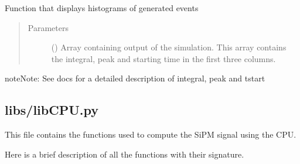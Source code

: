 \documentclass[letterpaper,10pt,english]{sphinxmanual}
\begin{document}

\begin{fulllineitems}
\label{\detokenize{structure:libs.lib.somestats}}
Function that displays histograms of generated events
\begin{quote}\begin{description}
\item[{Parameters}] \leavevmode
{} () \textendash{} Array containing output of the simulation. This array contains the integral, peak and starting time in the first three columns.

\end{description}\end{quote}

\begin{sphinxadmonition}{note}{Note:}
See docs for a detailed description of integral, peak and tstart
\end{sphinxadmonition}

\end{fulllineitems}



\subsection{libs/libCPU.py}
\label{\detokenize{structure:libs-libcpu-py}}
\begin{DUlineblock}{0em}
\item[] This file contains the functions used to compute the SiPM signal using the CPU.
\item[] Here is a brief description of all the functions with their signature.
\end{DUlineblock}
\end{document}
